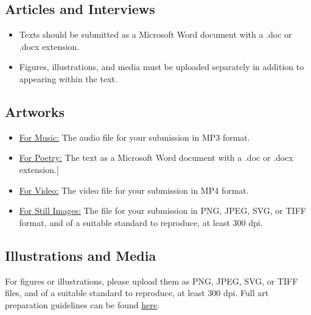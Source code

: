 \documentclass[12pt]{article}
\begin{document}

\subsection{Articles and Interviews}

\begin{itemize}[noitemsep]
\item Texts should be submitted as a Microsoft Word document with a .doc or .docx extension. 
\item Figures, illustrations, and media must be uploaded separately in addition to appearing within the text.
\end{itemize}

\subsection*{Artworks}

\begin{itemize}[noitemsep]
\item \uline{For Music:} The audio file for your submission in MP3 format.
\item \uline{For Poetry:} The text as a Microsoft Word document with a .doc or .docx extension.]
\item \uline{For Video:} The video file for your submission in MP4 format.
\item \uline{For Still Images:} The file for your submission in PNG, JPEG, SVG, or TIFF format, and of a suitable standard to reproduce, at least 300 dpi.
\end{itemize}

\subsection{Illustrations and Media}

For figures or illustrations, please upload them as PNG, JPEG, SVG, or TIFF files, and of a suitable standard to reproduce, at least 300 dpi. Full art preparation guidelines can be found \href{https://drive.google.com/file/d/1XBrYgYhOPmB3yAnfSL3PqGKXPNw0NAFE/view}{here}.
\end{document}
